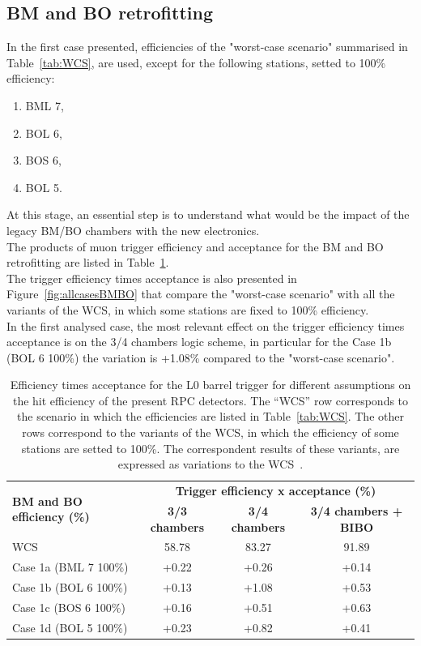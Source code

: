 \subsection{BM and BO retrofitting}
\label{sec:BMBO_retrofit}
In the first case presented, efficiencies of the "worst-case scenario" summarised in Table~\ref{tab:WCS}, are used, except for the following stations, setted to 100\% efficiency:
\renewcommand{\labelenumii}{\Lowercase{enumii}}
\begin{enumerate}
\item BML 7,
\item BOL 6,
\item BOS 6,
\item BOL 5.
\end{enumerate}
At this stage, an essential step is to understand what would be the impact of the legacy BM/BO chambers with the new electronics.\\
The products of muon trigger efficiency and acceptance for the BM and BO retrofitting are listed in Table~\ref{tab:allcasesBMBO}.\\
The trigger efficiency times acceptance is also presented in Figure~\ref{fig:allcasesBMBO} that compare the "worst-case scenario" with all the variants of the WCS, in which some stations are fixed to 100\% efficiency.\\
In the first analysed case, the most relevant effect on the trigger efficiency times acceptance is on the 3/4 chambers logic scheme, in particular for the Case 1b (BOL 6 100\%) the variation is +1.08\% compared to the "worst-case scenario".
\begin{table}[h]
	\begin{center}
		\small
		\begin{tabular}{l|c|c|c}
			\hline
			\multirow{2}{*}{\textbf{BM and BO efficiency (\%)}} & \multicolumn{3}{c}{\textbf{Trigger efficiency x acceptance (\%)}}\\
			\cline{2-4}   
			& \textbf{3/3 chambers} & \textbf{3/4 chambers} & \textbf{3/4 chambers + BIBO}\\
			\hline 
			WCS 												& 58.78 				& 83.27 		& 91.89\\
			Case 1a (BML 7 100\%) 								& +0.22                 & +0.26 		& +0.14\\
			Case 1b (BOL 6 100\%) 								& +0.13 				& +1.08 		& +0.53\\
			Case 1c (BOS 6 100\%) 								& +0.16 				& +0.51 		& +0.63\\
			Case 1d (BOL 5 100\%) 								& +0.23 				& +0.82 		& +0.41\\		
			\hline 
		\end{tabular} 
		\caption{Efficiency times acceptance for the L0 barrel trigger for different assumptions on the hit efficiency of the present RPC detectors. The “WCS” row corresponds to the scenario in which the efficiencies are listed in Table~\ref{tab:WCS}. The other rows correspond to the variants of the WCS, in which the efficiency of some stations are setted to 100\%. The correspondent results of these variants, are expressed as variations to the WCS~\cite{Marcoccia:2693982}.} 
		\label{tab:allcasesBMBO}
	\end{center} 
\end{table} 


